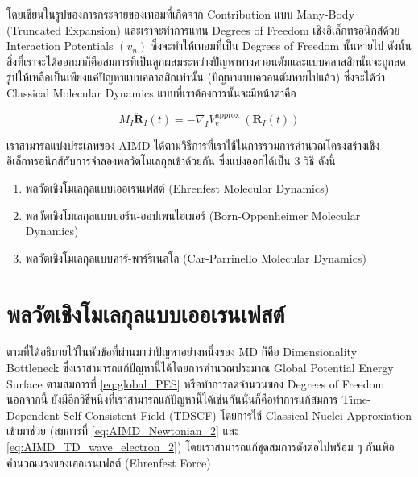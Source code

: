 \noindent โดยเขียนในรูปของการกระจายของเทอมที่เกิดจาก Contribution แบบ Many-Body (Truncated Expansion) และเราจะทำการแทน
Degrees of Freedom เชิงอิเล็กทรอนิกส์ด้วย Interaction Potentials $(v_n)$ ซึ่งจะทำให้เทอมที่เป็น Degrees of Freedom นั้นหายไป 
ดังนั้นสิ่งที่เราจะได้ออกมาก็คือสมการที่เป็นลูกผสมระหว่างปัญหาทางควอนตัมและแบบคลาสสิกนั้นจะถูกลดรูปให้เหลือเป็นเพียงแค่ปัญหาแบบคลาสสิกเท่านั้น 
(ปัญหาแบบควอนตัมหายไปแล้ว) ซึ่งจะได้ว่า Classical Molecular Dynamics แบบที่เราต้องการนั้นจะมีหน้าตาคือ

\begin{equation}
  M_I \ddot{\mathbf{R}}_I(t)
  =
  -\nabla_I V_{\mathrm{e}}^{\text{approx }}\left(\mathbf{R}_I(t)\right)
\end{equation}

เราสามารถแบ่งประเภทของ AIMD ได้ตามวิธีการที่เราใช้ในการรวมการคำนวณโครงสร้างเชิงอิเล็กทรอนิกส์กับการจำลองพลวัตโมเลกุลเข้าด้วยกัน
ซึ่งแบ่งออกได้เป็น 3 วิธี ดังนี้

\begin{enumerate}[topsep=0pt,noitemsep]
  \setlength\itemsep{0.5em}
  \item พลวัตเชิงโมเลกุลแบบเออเรนเฟสต์ (Ehrenfest Molecular Dynamics)

  \item พลวัตเชิงโมเลกุลแบบบอร์น-ออปเพนไฮเมอร์ (Born-Oppenheimer Molecular Dynamics)

  \item พลวัตเชิงโมเลกุลแบบคาร์-พาร์ริเนลโล (Car-Parrinello Molecular Dynamics)
\end{enumerate}

\section{พลวัตเชิงโมเลกุลแบบเออเรนเฟสต์}

ตามที่ได้อธิบายไว้ในหัวข้อที่ผ่านมาว่าปัญหาอย่างหนึ่งของ MD ก็คือ Dimensionality Bottleneck ซึ่งเราสามารถแก้ปัญหานี้ได้โดยการคำนวณประมาณ
Global Potential Energy Surface ตามสมการที่ \eqref{eq:global_PES} หรือทำการลดจำนวนของ Degrees of Freedom นอกจากนี้
ยังมีอีกวิธีหนึ่งที่เราสามารถแก้ปัญหานี้ได้เช่นกันนั่นก็คือทำการแก้สมการ Time-Dependent Self-Consistent Field (TDSCF) โดยการใช้
Classical Nuclei Approxiation เข้ามาช่วย (สมการที่ \eqref{eq:AIMD_Newtonian_2} และ \eqref{eq:AIMD_TD_wave_electron_2})
โดยเราสามารถแก้ชุดสมการดังต่อไปพร้อม ๆ กันเพื่อคำนวณแรงของเออเรนเฟสต์ (Ehrenfest Force)

